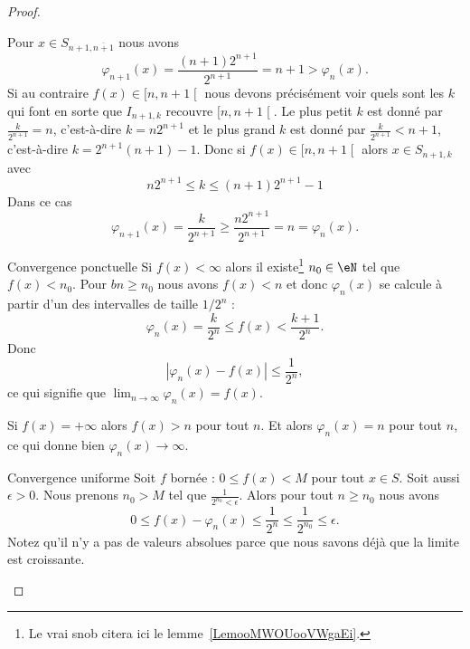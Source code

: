 \begin{proof}
\begin{subproof}
        Pour \( x\in S_{n+1,\overline{ n+1 }}\) nous avons
        \begin{equation}
            \varphi_{n+1}(x)=\frac{ (n+1)2^{n+1} }{ 2^{n+1} }=n+1>\varphi_n(x).
        \end{equation}
        Si au contraire \( f(x)\in\mathopen[ n , n+1 \mathclose[ \) nous devons précisément voir quels sont les \( k\) qui font en sorte que \( I_{n+1,k}\) recouvre \( \mathopen[ n , n+1 \mathclose[\). Le plus petit \( k\) est donné par \( \frac{ k }{ 2^{n+1} }=n\), c'est-à-dire \( k=n2^{n+1}\) et le plus grand \( k\) est donné par \( \frac{ k }{ 2^{n+1} }<n+1\), c'est-à-dire \( k=2^{n+1}(n+1)-1\). Donc si \( f(x)\in\mathopen[ n , n+1 \mathclose[\) alors \( x\in S_{n+1,k}\) avec
        \begin{equation}
            n2^{n+1}\leq k\leq (n+1)2^{n+1}-1
        \end{equation}
        Dans ce cas
        \begin{equation}
            \varphi_{n+1}(x)=\frac{ k }{ 2^{n+1} }\geq \frac{ n2^{n+1} }{ 2^{n+1} }=n=\varphi_n(x).
        \end{equation}
    \item[Convergence ponctuelle]
        Si \( f(x)<\infty\) alors il existe\footnote{Le vrai snob citera ici le lemme~\ref{LemooMWOUooVWgaEi}.} \( n_0\in\eN\) tel que \( f(x)<n_0\). Pour \( bn\geq n_0\) nous avons \( f(x)<n\) et donc \( \varphi_n(x)\) se calcule à partir d'un des intervalles de taille \( 1/2^n\) :
        \begin{equation}
            \varphi_n(x)=\frac{ k }{ 2^n }\leq f(x)<\frac{ k+1 }{ 2^n }.
        \end{equation}
        Donc
        \begin{equation}
            | \varphi_n(x)-f(x) |\leq \frac{1}{ 2^n },
        \end{equation}
        ce qui signifie que \( \lim_{n\to \infty} \varphi_n(x)=f(x)\).

        Si \( f(x)=+\infty\) alors \( f(x)>n\) pour tout \( n\). Et alors \( \varphi_n(x)=n\) pour tout \( n\), ce qui donne bien \( \varphi_n(x)\to \infty\).
    \item[Convergence uniforme]
        Soit \( f\) bornée : \( 0\leq f(x)<M\) pour tout \( x\in S\). Soit aussi \( \epsilon>0\). Nous prenons \( n_0>M\) tel que \( \frac{1}{ 2^{n_0}<\epsilon }\). Alors pour tout \( n\geq n_0\) nous avons
        \begin{equation}
            0\leq f(x)-\varphi_n(x)\leq \frac{1}{ 2^n }\leq \frac{1}{ 2^{n_0} }\leq \epsilon.
        \end{equation}
        Notez qu'il n'y a pas de valeurs absolues parce que nous savons déjà que la limite est croissante.
    \end{subproof}
\end{proof}

